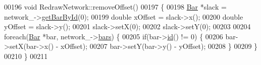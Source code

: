 \begin{DoxyCode}
00196 \textcolor{keywordtype}{void} RedrawNetwork::removeOffset()
00197 \{
00198   \hyperlink{class_bar}{Bar} *slack = network\_->\hyperlink{group___models_ga04d524ce0fa0dd0d06deda92b1597af0}{getBarById}(0);
00199   \textcolor{keywordtype}{double} xOffset = slack->x();
00200   \textcolor{keywordtype}{double} yOffset = slack->y();
00201   slack->setX(0);
00202   slack->setY(0);
00203 
00204   \textcolor{keywordflow}{foreach}(\hyperlink{class_bar}{Bar} *bar, network\_->\hyperlink{class_network_ae37a8418e42adf765b143cdc9d992b6c}{bars}) \{
00205     \textcolor{keywordflow}{if}(bar->\hyperlink{group___models_gacf0fb781a73856bb7beb823304465e13}{id}() != 0) \{
00206       bar->setX(bar->x() - xOffset);
00207       bar->setY(bar->y() - yOffset);
00208     \}
00209   \}
00210 \}
00211 
\end{DoxyCode}
